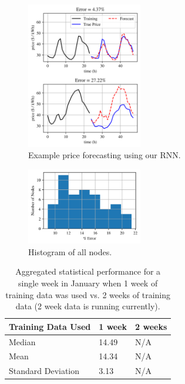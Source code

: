 \documentclass[sigconf]{acmart}
\begin{document}
\begin{figure}[h]
\includegraphics[width=0.45\textwidth]{fig_3.png}
\caption{Example price forecasting using our RNN.}
\label{fig:ex_prices}
\end{figure}

\begin{figure}[h]
\includegraphics[width=0.45\textwidth]{fig_5.png}
\caption{Histogram of all nodes.}
\label{fig:hist_small}
\end{figure}



\begin{table}[]
\begin{tabular}{lll}
\hline
Training Data Used & 1 week & 2 weeks \\
\hline
Median             & 14.49  & N/A     \\
Mean               & 14.34  & N/A     \\
Standard Deviation & 3.13   & N/A    \\
\hline
\end{tabular}
\caption{Aggregated statistical performance for a single week in January when 1 week of training data was used vs. 2 weeks of training data (2 week data is running currently).}
\label{tab:all_nodes}
\end{table}
\end{document}
